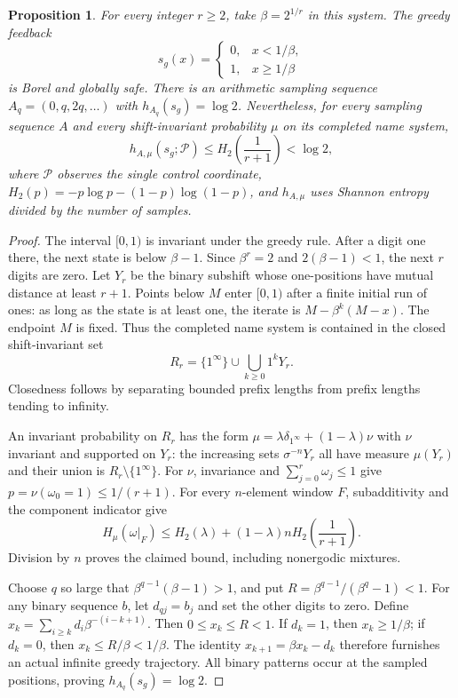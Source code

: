 \documentclass[11pt,reqno]{amsart}
\numberwithin{equation}{section}
\newtheorem{proposition}[theorem]{Proposition}
\theoremstyle{definition}
\theoremstyle{definition}
\begin{document}
\begin{proposition}\label{prop:shannon-boundary}
For every integer $r\ge2$, take $\beta=2^{1/r}$ in this system.
The greedy feedback
\[
 s_g(x)=\begin{cases}0,&x<1/\beta,\\1,&x\ge1/\beta\end{cases}
\]
is Borel and globally safe. There is an arithmetic sampling
sequence $A_q=(0,q,2q,\ldots)$ with $h_{A_q}(s_g)=\log2$.
Nevertheless, for every sampling sequence $A$ and every
shift-invariant probability $\mu$ on its completed name system,
\[
 h_{A,\mu}(s_g;\mathcal P)\le
 H_2\left(\frac1{r+1}\right)<\log2,
\]
where $\mathcal P$ observes the single control coordinate,
$H_2(p)=-p\log p-(1-p)\log(1-p)$, and $h_{A,\mu}$ uses Shannon
entropy divided by the number of samples.
\end{proposition}
\begin{proof}
The interval $[0,1)$ is invariant under the greedy rule.
After a digit one there, the next state is below $\beta-1$.
Since $\beta^r=2$ and $2(\beta-1)<1$, the next $r$ digits
are zero. Let $Y_r$ be the binary subshift whose one-positions
have mutual distance at least $r+1$. Points below $M$ enter
$[0,1)$ after a finite initial run of ones: as long as the
state is at least one, the iterate is
$M-\beta^k(M-x)$. The endpoint $M$ is fixed. Thus the
completed name system is contained in the closed shift-invariant set
\[
 R_r=\{1^\infty\}\cup\bigcup_{k\ge0}1^kY_r.
\]
Closedness follows by separating bounded prefix lengths from
prefix lengths tending to infinity.

An invariant probability on $R_r$ has the form
$\mu=\lambda\delta_{1^\infty}+(1-\lambda)\nu$ with $\nu$
invariant and supported on $Y_r$: the increasing sets
$\sigma^{-n}Y_r$ all have measure $\mu(Y_r)$ and their union
is $R_r\setminus\{1^\infty\}$.
For $\nu$, invariance and $\sum_{j=0}^r\omega_j\le1$ give
$p=\nu(\omega_0=1)\le1/(r+1)$. For every $n$-element window $F$,
subadditivity and the component indicator give
\[
 H_\mu(\omega|_F)
 \le H_2(\lambda)+(1-\lambda)nH_2\left(\frac1{r+1}\right).
\]
Division by $n$ proves the claimed bound, including
nonergodic mixtures.

Choose $q$ so large that
$\beta^{q-1}(\beta-1)>1$, and put
$R=\beta^{q-1}/(\beta^q-1)<1$.
For any binary sequence $b$, let $d_{qj}=b_j$ and set the
other digits to zero. Define
$x_k=\sum_{i\ge k}d_i\beta^{-(i-k+1)}$.
Then $0\le x_k\le R<1$.
If $d_k=1$, then $x_k\ge1/\beta$; if $d_k=0$, then
$x_k\le R/\beta<1/\beta$.
The identity $x_{k+1}=\beta x_k-d_k$ therefore furnishes an
actual infinite greedy trajectory. All binary patterns occur
at the sampled positions, proving $h_{A_q}(s_g)=\log2$.
\end{proof}
\end{document}
